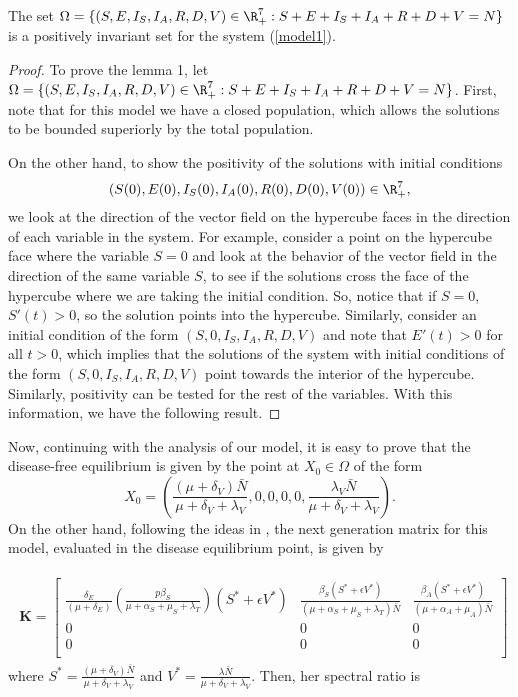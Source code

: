 

\begin{lemma}
    The set  $\Omega=\{(S,E,I_S,I_A,R,D,V)\in \R^{7}_{+}: S+E+I_S+I_A+R+D+V=N\}$ is a 
    positively invariant set for the system (\ref{model1}).
\end{lemma}

\begin{proof}
To prove the lemma 1, let $\Omega=\{(S,E,I_S,I_A,R,D,V)\in \R^{7}_{+}: S+E+I_S+I_A+R+D+V=N\}$. First, note that for this model we have a closed population, which allows the solutions to be bounded superiorly by the total population. 

On the other hand, to show the positivity of the solutions with initial conditions $$(S (0), E (0), I_S (0), I_A (0), R (0), D (0), V (0)) \in \R^{7}_{+},$$ we look at the direction of the vector field on the hypercube faces in the direction of each variable in the system. For example, consider a point on the hypercube face where the variable $S = 0$ and look at the behavior of the vector field in the direction of the same variable $S$, to see if the solutions cross the face of the hypercube where we are taking the initial condition. So, notice that if $ S = 0 $, $ S '(t) > 0 $, so the solution points into the hypercube. Similarly, consider an initial condition of the form $ (S, 0, I_S, I_A, R, D, V) $ and note that $ E '(t)> 0 $ for all $ t> 0 $, which implies that the solutions of the system with initial conditions of the form $  (S, 0, I_S, I_A, R, D, V)  $ point towards the interior of the hypercube. Similarly, positivity can be tested for the rest of the variables. With this information, we have the following result.
\end{proof}


Now, continuing with the analysis of our model, it is easy to prove that the disease-free equilibrium is given by the point at $ X_0 \in \Omega $ of the form
$$
    X_0 =\left(
            \frac{(\mu+\delta_V)\bar{N}}{\mu+\delta_V+\lambda_V}, 
            0, 0, 0, 0,
            \frac{\lambda_V \bar{N}}{\mu+\delta_V+\lambda_V}
    \right).
$$
On the other hand, following the ideas in \cite{Diekmann1990, Van2002}, the next generation matrix for this model, evaluated in the disease equilibrium point, is given by

\begin{align}\label{NGM1}
    \begin{split}
    \textbf{K}=
    \begin{bmatrix}
        \frac{\delta_E}{(\mu + \delta_E)}
        \left(\frac{p\beta_S}{\mu + \alpha_S + \mu_S + \lambda_T} \right) (S^* + \epsilon V^*) 
        & \frac{\beta_S (S^* + \epsilon V^*)}{(\mu + \alpha_S + \mu_S + \lambda_T)\bar{N}} 
        & \frac{\beta_A (S^* + \epsilon V^*)}{(\mu + \alpha_A + \mu_A) \bar{N}}
        \\
        0 & 0 & 0 \\
        0 & 0 & 0  \\
    \end{bmatrix}
\end{split}
\end{align}
where $S^*=\frac{(\mu+\delta_V)\bar{N}}{\mu+\delta_V+\lambda_V}$ 
and $V^*=\frac{\lambda \bar{N}}{\mu+\delta_V+\lambda_V}$. Then, her spectral ratio is

